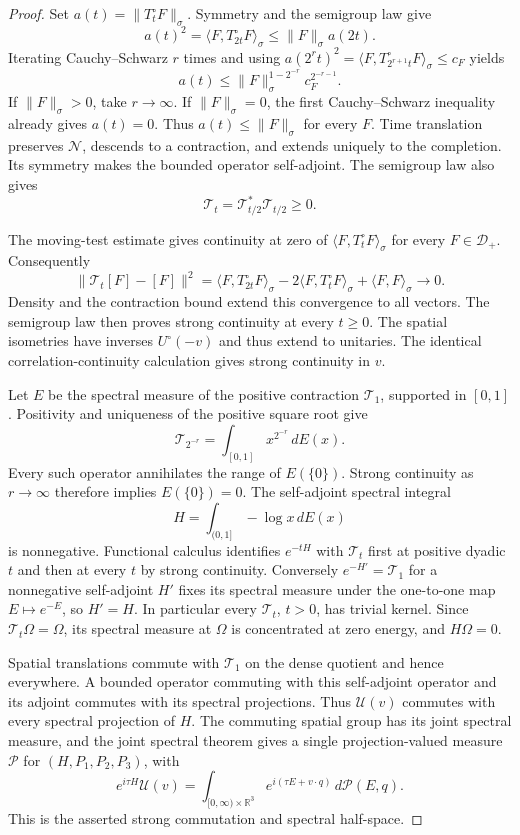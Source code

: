 \documentclass[11pt,letterpaper,reqno]{amsart}
\theoremstyle{definition}
\theoremstyle{remark}
\newcommand{\R}{\mathbb R}
\begin{document}
\begin{proof}
Set $a(t)=\|T_t^\circ F\|_\sigma$. Symmetry and the semigroup law
give
\[
 a(t)^2=\langle F,T_{2t}^\circ F\rangle_\sigma
       \le\|F\|_\sigma a(2t).
\]
Iterating Cauchy--Schwarz $r$ times and using
$a(2^rt)^2=\langle F,T_{2^{r+1}t}^\circ F\rangle_\sigma\le c_F$
yields
\[
 a(t)\le\|F\|_\sigma^{1-2^{-r}}c_F^{2^{-r-1}}.
\]
If $\|F\|_\sigma>0$, take $r\to\infty$. If
$\|F\|_\sigma=0$, the first Cauchy--Schwarz inequality already gives
$a(t)=0$. Thus $a(t)\le\|F\|_\sigma$ for every $F$.
Time translation preserves $\mathcal N$, descends to a contraction,
and extends uniquely to the completion. Its symmetry makes the bounded
operator self-adjoint. The semigroup law also gives
\[
 \mathcal T_t=\mathcal T_{t/2}^*\mathcal T_{t/2}\ge0.
\]

The moving-test estimate gives continuity at zero of
$\langle F,T_t^\circ F\rangle_\sigma$ for every $F\in\mathcal D_+$.
Consequently
\[
 \|\mathcal T_t[F]-[F]\|^2
 =\langle F,T_{2t}^\circ F\rangle_\sigma
     -2\langle F,T_t^\circ F\rangle_\sigma+\langle F,F\rangle_\sigma
 \longrightarrow0.
\]
Density and the contraction bound extend this convergence to all
vectors. The semigroup law then proves strong continuity at every
$t\ge0$. The spatial isometries have inverses $U^\circ(-v)$ and
thus extend to unitaries. The identical correlation-continuity
calculation gives strong continuity in $v$.

Let $E$ be the spectral measure of the positive contraction
$\mathcal T_1$, supported in $[0,1]$. Positivity and uniqueness of
the positive square root give
\[
 \mathcal T_{2^{-r}}=\int_{[0,1]}x^{2^{-r}}\,dE(x).
\]
Every such operator annihilates the range of $E(\{0\})$.
Strong continuity as $r\to\infty$ therefore implies
$E(\{0\})=0$. The self-adjoint spectral integral
\[
 H=\int_{(0,1]}-\log x\,dE(x)
\]
is nonnegative. Functional calculus identifies $e^{-tH}$ with
$\mathcal T_t$ first at positive dyadic $t$ and then at every $t$
by strong continuity. Conversely $e^{-H'}=\mathcal T_1$ for a
nonnegative self-adjoint $H'$ fixes its spectral measure under the
one-to-one map $E\mapsto e^{-E}$, so $H'=H$.
In particular every $\mathcal T_t$, $t>0$, has trivial kernel.
Since $\mathcal T_t\Omega=\Omega$, its spectral measure at
$\Omega$ is concentrated at zero energy, and $H\Omega=0$.

Spatial translations commute with $\mathcal T_1$ on the dense
quotient and hence everywhere. A bounded operator commuting with this
self-adjoint operator and its adjoint commutes with its spectral
projections. Thus $\mathcal U(v)$ commutes with every spectral
projection of $H$. The commuting spatial group has its joint spectral
measure, and the joint spectral theorem gives a single projection-valued
measure $\mathcal P$ for $(H,P_1,P_2,P_3)$, with
\[
 e^{i\tau H}\mathcal U(v)
    =\int_{[0,\infty)\times\R^3}
              e^{i(\tau E+v\cdot q)}\,d\mathcal P(E,q).
\]
This is the asserted strong commutation and spectral half-space.
\end{proof}
\end{document}
